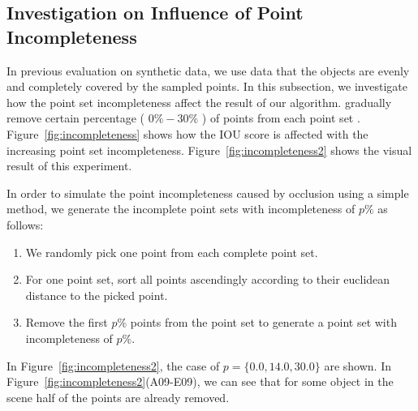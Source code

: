 \subsection{Investigation on Influence of Point Incompleteness}
\label{sec:exp-incompleteness}


In previous evaluation on synthetic data, we use data that the objects are evenly and completely covered by the sampled points. 
%
In this subsection, we investigate how the point set incompleteness affect the result of our algorithm. 
%
 gradually remove certain percentage ( $0\%-30\%$ ) of points from each point set .
% 
Figure~\ref{fig:incompleteness} shows how the IOU score is affected with the increasing point set incompleteness. 
Figure~\ref{fig:incompleteness2} shows the visual result of this experiment. 


In order to simulate the point incompleteness caused by occlusion using a simple method, we generate the incomplete point sets with incompleteness of $p\%$ as follows:
\begin{enumerate}
	\item We randomly pick one point from each complete point set. 
	\item For one point set, sort all points ascendingly according to their euclidean distance to the picked point.  
	\item Remove the first $p\%$ points from the point set to generate a point set with incompleteness of $p\%$.
\end{enumerate}
%
In Figure~\ref{fig:incompleteness2}, the case of $p=\{0.0,14.0,30.0\}$ are shown. In Figure~\ref{fig:incompleteness2}(A09-E09), we can see that for some object in the scene half of the points are already removed.



